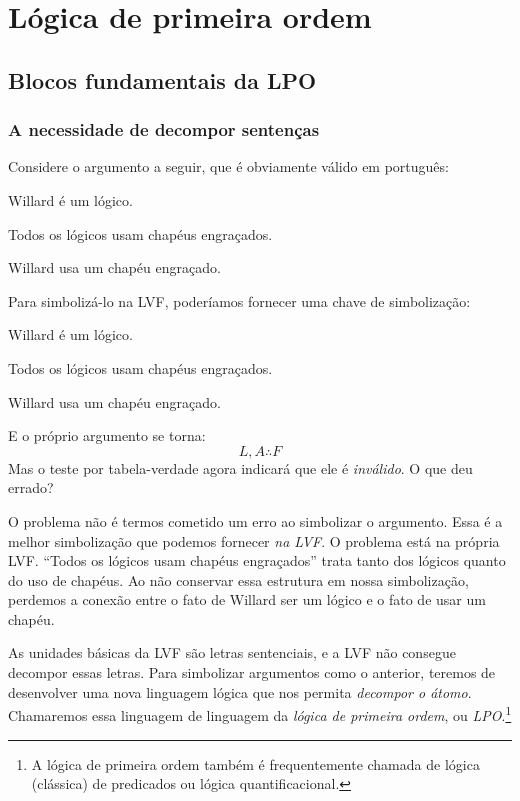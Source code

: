 \part{Lógica de primeira ordem}
\label{ch.FOL}
\chapter{Blocos fundamentais da LPO}\label{s:FOLBuildingBlocks}

\section{A necessidade de decompor sentenças}
Considere o argumento a seguir, que é obviamente válido em português:
\begin{earg}
\label{willard1}
\item[] Willard é um lógico.
\item[] Todos os lógicos usam chapéus engraçados.
\item[\texttherefore] Willard usa um chapéu engraçado.
\end{earg}
Para simbolizá-lo na LVF, poderíamos fornecer uma chave de simbolização:
\begin{ekey}
\item[L] Willard é um lógico.
\item[A] Todos os lógicos usam chapéus engraçados.
\item[F] Willard usa um chapéu engraçado.
\end{ekey}
E o próprio argumento se torna:
$$L, A \therefore F$$
Mas o teste por tabela-verdade agora indicará que ele é \emph{inválido}. O que deu errado?

O problema não é termos cometido um erro ao simbolizar o argumento. Essa é a melhor simbolização que podemos fornecer \emph{na LVF}. O problema está na própria LVF. \textquotedblleft Todos os lógicos usam chapéus engraçados\textquotedblright{} trata tanto dos lógicos quanto do uso de chapéus. Ao não conservar essa estrutura em nossa simbolização, perdemos a conexão entre o fato de Willard ser um lógico e o fato de usar um chapéu.

As unidades básicas da LVF são letras sentenciais, e a LVF não consegue decompor essas letras. Para simbolizar argumentos como o anterior, teremos de desenvolver uma nova linguagem lógica que nos permita \emph{decompor o átomo}. Chamaremos essa linguagem de linguagem da \emph{lógica de primeira ordem}, ou \emph{LPO}.\footnote{A lógica de primeira ordem também é frequentemente chamada de lógica (clássica) de predicados ou lógica quantificacional.}

